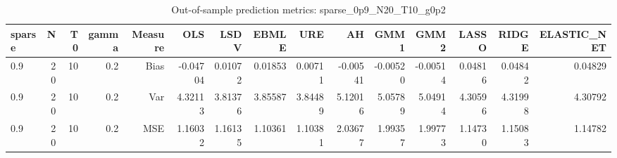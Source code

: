 \begin{table}[!htbp]\centering
\caption{Out-of-sample prediction metrics: sparse_0p9_N20_T10_g0p2}
\label{tab:table3_sparse_0p9_N20_T10_g0p2}
\begin{tabular}{lrrrrrrrrrrrrrr}
\hline
sparse & N & T0 & gamma & Measure & OLS & LSDV & EBMLE & URE & AH & GMM1 & GMM2 & LASSO & RIDGE & ELASTIC_NET \\
\hline
0.9 & 20 & 10 & 0.2 & Bias & -0.04704 & 0.01072 & 0.01853 & 0.00711 & -0.00541 & -0.00520 & -0.00514 & 0.04816 & 0.04842 & 0.04829 \\
0.9 & 20 & 10 & 0.2 & Var & 4.32113 & 3.81376 & 3.85587 & 3.84489 & 5.12016 & 5.05789 & 5.04914 & 4.30596 & 4.31998 & 4.30792 \\
0.9 & 20 & 10 & 0.2 & MSE & 1.16032 & 1.16135 & 1.10361 & 1.10381 & 2.03677 & 1.99357 & 1.99773 & 1.14730 & 1.15083 & 1.14782 \\
\hline
\end{tabular}
\end{table}

